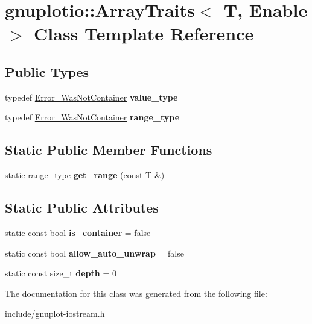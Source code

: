\hypertarget{classgnuplotio_1_1ArrayTraits}{}\section{gnuplotio\+:\+:Array\+Traits$<$ T, Enable $>$ Class Template Reference}
\label{classgnuplotio_1_1ArrayTraits}
\subsection*{Public Types}
\begin{DoxyCompactItemize}
\item 
\mbox{\label{classgnuplotio_1_1ArrayTraits_a3bcae12a7bf42af90f4946acc66f27e0}} 
typedef \hyperlink{structgnuplotio_1_1Error__WasNotContainer}{Error\+\_\+\+Was\+Not\+Container} {\bfseries value\+\_\+type}
\item 
\mbox{\label{classgnuplotio_1_1ArrayTraits_ae53464a5175c03deec403392b8dcb3c5}} 
typedef \hyperlink{structgnuplotio_1_1Error__WasNotContainer}{Error\+\_\+\+Was\+Not\+Container} {\bfseries range\+\_\+type}
\end{DoxyCompactItemize}
\subsection*{Static Public Member Functions}
\begin{DoxyCompactItemize}
\item 
\mbox{\label{classgnuplotio_1_1ArrayTraits_aee31432f330f9f9e4f5af628641181f7}} 
static \hyperlink{structgnuplotio_1_1Error__WasNotContainer}{range\+\_\+type} {\bfseries get\+\_\+range} (const T \&)
\end{DoxyCompactItemize}
\subsection*{Static Public Attributes}
\begin{DoxyCompactItemize}
\item 
\mbox{\label{classgnuplotio_1_1ArrayTraits_ac5d19b25086565613c305960bd9d4a78}} 
static const bool {\bfseries is\+\_\+container} = false
\item 
\mbox{\label{classgnuplotio_1_1ArrayTraits_a354d64663551a34c36c5fa7823859668}} 
static const bool {\bfseries allow\+\_\+auto\+\_\+unwrap} = false
\item 
\mbox{\label{classgnuplotio_1_1ArrayTraits_a6fbd8c815e595f4efbcafd9b0eeb06f2}} 
static const size\+\_\+t {\bfseries depth} = 0
\end{DoxyCompactItemize}


The documentation for this class was generated from the following file\+:\begin{DoxyCompactItemize}
\item 
include/gnuplot-\/iostream.\+h\end{DoxyCompactItemize}
